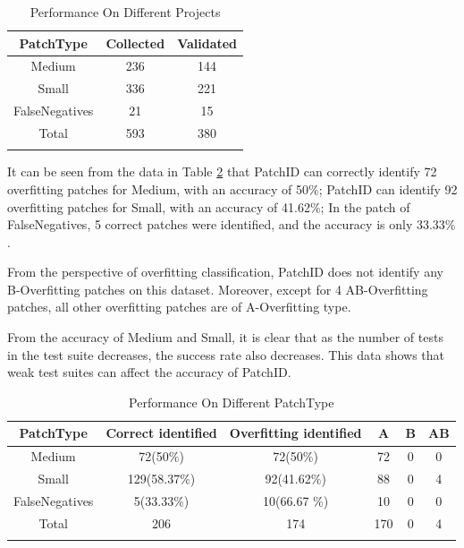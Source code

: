 \documentclass[sn-basic]{sn-jnl}
\theoremstyle{thmstyleone}
\theoremstyle{thmstyletwo}
\theoremstyle{thmstylethree}
\begin{document}
\begin{table}[ht]
	\begin{center}
		\begin{minipage}{175px}
			\caption{Performance On Different Projects}\label{tab5}%
			\begin{tabular}{ccc}
				\toprule
				PatchType & Collected & Validated \\
				\midrule
				Medium    &236 &144 \\
				Small    &336 &221 \\
				FalseNegatives   &21 &15 \\
				Total   &593 &380 \\
				\botrule
			\end{tabular}
		\end{minipage}
	\end{center}
\end{table}

It can be seen from the data in Table \ref{tab6} that PatchID can correctly identify 72 overfitting patches for Medium, with an accuracy of 50$\%$; PatchID can identify 92 overfitting patches for Small, with an accuracy of 41.62$\%$; In the patch of FalseNegatives, 5 correct patches were identified, and the accuracy is only 33.33$\%$.

From the perspective of overfitting classification, PatchID does not identify any B-Overfitting patches on this dataset. Moreover, except for 4 AB-Overfitting patches, all other overfitting patches are of A-Overfitting type.

From the accuracy of Medium and Small, it is clear that as the number of tests in the test suite decreases, the success rate also decreases. This data shows that weak test suites can affect the accuracy of PatchID.

\begin{table}[ht]
	\begin{center}
		\begin{minipage}{\textwidth}
			\caption{Performance On Different PatchType}\label{tab6}%
			\begin{tabular}{cccccc}
				\toprule
				PatchType & Correct identified & Overfitting identified &A &B &AB
				\\
				\midrule
				Medium    &72(50$\%$) &72(50$\%$) &72 &0 &0    \\
				Small    &129(58.37$\%$) &92(41.62$\%$) &88 &0 &4    \\
				FalseNegatives    &5(33.33$\%$) &10(66.67	$\%$) &10 &0 &0    \\
				Total    &206 &174 &170 &0 &4    \\
				\botrule
			\end{tabular}
		\end{minipage}
	\end{center}
\end{table}
\end{document}
